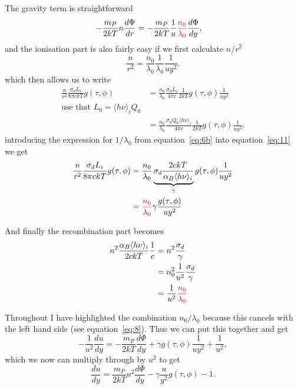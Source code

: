 \documentclass[11pt]{article}
\newcommand{\ddr}[1]{\frac{d#1}{dr}}
\newcommand{\ddy}[1]{\frac{d#1}{dy}}
\newcommand{\hnui}{\ensuremath{\langle h\nu\rangle_i}}
\begin{document}
The gravity term is straightforward
\begin{align}
  \label{eq:Phi_eq}
  -\frac{m_P}{2kT} n \ddr{\Phi} & = -\frac{m_P}{2kT}\frac{1}{u}{\color{red} \frac{n_0}{\lambda_0}} \ddy{\Phi},
\end{align}
and the ionisation part is also fairly easy if we first calculate $n/r^2$
\begin{equation}
  \label{eq:11}
  \frac{n}{r^2} = \frac{n_0}{\lambda_0}\frac{1}{\lambda_0} \frac{1}{uy^2}.
\end{equation}
which then allows us to write
\begin{align}
  \label{eq:10}
  \frac{n}{r^2} \frac{\sigma_d L_i}{8\pi ck T} g(\tau, \phi) & = \frac{n_0}{\lambda_0} \frac{\sigma_d L_i}{4\pi c}\frac{1}{2kT} g(\tau, \phi)\frac{1}{uy^2} \\
                                                              \mbox{use that } L_0=\hnui Q_0 &  \\
  \label{eq:11}
  & =  \frac{n_0}{\lambda_0} \frac{\sigma_d Q_0 \hnui }{4\pi c}\frac{1}{2kT} g(\tau, \phi)\frac{1}{uy^2}.
\end{align}
introducing the expression for $1/\lambda_0$ from equation~\eqref{eq:6b} into equation~\eqref{eq:11} we get
\begin{align}
  \label{eq:12}
  \frac{n}{r^2} \frac{\sigma_d L_i}{8\pi ck T} g(\tau, \phi) & = \frac{n_0}{\lambda_0}
                                                               \underbrace{\sigma_d \frac{2ckT}{\alpha_B \hnui}}_{\gamma} g(\tau,\phi)\frac{1}{uy^2} \\
  & = {\color{red} \frac{n_0}{\lambda_0}} \gamma \frac{g(\tau,\phi)}{uy^2}
\end{align}

And finally the recombination part becomes
\begin{align}
  \label{eq:13}
  n^2 \frac{\alpha_B\hnui}{2c kT}\frac{1}{c} & = n^2 \frac{\sigma_d}{\gamma} \\
                                             & = n_0^2 \frac{1}{u^2}\frac{\sigma_d}{\gamma} \\
  & = \frac{1}{u^2}{\color{red} \frac{n_0}{\lambda_0}}
\end{align}

Throughout I have highlighted the combination $n_0/\lambda_0$ because this cancels with the left hand side (see equation~\eqref{eq:8}). Thus we can put this together and get
\begin{equation}
  \label{eq:14}
  -\frac{1}{u^2} \ddy{u} = -\frac{m_P}{2kT}\ddy{\Phi} + \gamma g(\tau,\phi)\frac{1}{uy^2} + \frac{1}{u^2},
\end{equation}
which we now can multiply through by $u^2$ to get
\begin{equation}
  \label{eq:u_eq}
  \ddy{u} = \frac{m_P}{2kT} u^2 \ddy{\Phi} - \gamma\frac{u}{y^2}g(\tau,\phi) - 1.
\end{equation}
\end{document}
